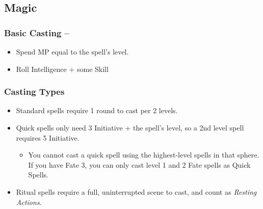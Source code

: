 \begin{multicols}{2}
\begin{itemize}
\end{itemize}

\subsection{Magic}

\subsubsection{Basic Casting -- \pageref{basiccasting}}

\begin{itemize}

	\item{Spend MP equal to the spell's level.}
	\item{Roll Intelligence + some Skill}

\end{itemize}

\subsubsection{Casting Types}

\begin{itemize}

	\item{Standard spells require 1 round to cast per 2 levels.}
	\item{Quick spells only need 3 Initiative + the spell's level, so a 2nd level spell requires 5 Initiative.}
	\begin{itemize}
		\item{You cannot cast a quick spell using the highest-level spells in that sphere.  If you have Fate 3, you can only cast level 1 and 2 Fate spells as Quick Spells.}
	\end{itemize}
	\item{Ritual spells require a full, uninterrupted scene to cast, and count as \textit{Resting Actions}.}

\end{itemize}

\end{multicols}
